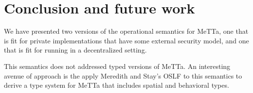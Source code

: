 \section{Conclusion and future work}

We have presented two versions of the operational semantics for MeTTa, one that is fit for private implementations that have some external security model, and one that is fit for running in a decentralized setting.

This semantics does not addressed typed versions of MeTTa. An interesting avenue of approach is the apply Meredith and Stay's OSLF to this semantics to derive a type system for MeTTa that includes spatial and behavioral types.
